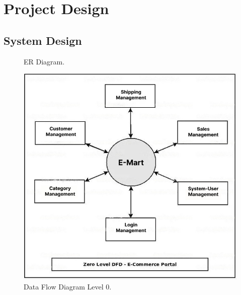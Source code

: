 \documentclass[11pt]{report}
\begin{document}
\chapter{Project Design}
 \label{xx}
\section{System Design}

\begin{figure}[H]
	\caption{ER Diagram.}
\end{figure} 
\begin{figure}[H]
	\includegraphics[width=\linewidth]{dfdl0.jpeg}
	\caption{Data Flow Diagram Level 0.}
\end{figure}
\end{document}
